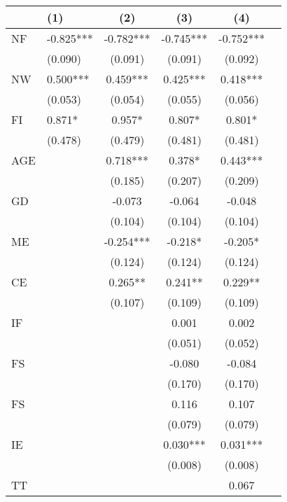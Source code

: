 \documentclass[ukenglish,nottitlepage,thmsb,11pt,letterpaper]{article}
\begin{document}
\begin{spacing}{1}
\begin{table}[H]
\begin{tabular*}{\textwidth}{l @{\extracolsep{\fill}} lcccc}
\toprule
& \textbf{(1)} & \textbf{(2)} & \textbf{(3)} & \textbf{(4)} \\
\midrule
NF           & -0.825***       & -0.782***       & -0.745***       & -0.752*** \\
& (0.090)        & (0.091)        & (0.091)        & (0.092) \\
NW           & 0.500***        & 0.459***        & 0.425***        & 0.418*** \\
& (0.053)        & (0.054)        & (0.055)       &(0.056) \\
FI           & 0.871*        & 0.957*        & 0.807*        & 0.801* \\
& (0.478)        & (0.479)        & (0.481)        & (0.481) \\
AGE          &              & 0.718***        & 0.378*        & 0.443*** \\
&              & (0.185)        & (0.207)        & (0.209) \\
GD           &              & -0.073       & -0.064       & -0.048 \\
&              & (0.104)        & (0.104)        & (0.104) \\
ME           &              & -0.254***       & -0.218*       & -0.205* \\
&              & (0.124)        & (0.124)        & (0.124) \\
CE           &              & 0.265**        & 0.241**        & 0.229** \\
&              & (0.107)        & (0.109)        & (0.109) \\
IF           &              &              & 0.001        & 0.002 \\
&              &              & (0.051)        & (0.052) \\
FS           &              &              & -0.080       & -0.084 \\
&              &              & (0.170)        & (0.170) \\
FS           &              &              & 0.116        & 0.107 \\
&              &              & (0.079)        & (0.079) \\
IE           &              &              & 0.030***        & 0.031*** \\
&              &              & (0.008)        & (0.008) \\
TT           &              &              &              & 0.067 \\

\end{tabular*}
\end{table}
\end{spacing}
\end{document}
